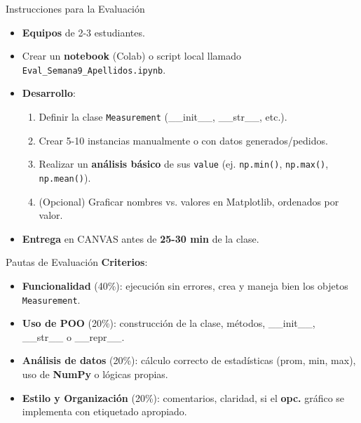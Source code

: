 \documentclass[10pt]{beamer}
\begin{document}
\begin{frame}{Instrucciones para la Evaluación}
  \begin{itemize}
    \item \textbf{Equipos} de 2-3 estudiantes.
    \item Crear un \textbf{notebook} (Colab) o script local llamado \texttt{Eval\_Semana9\_Apellidos.ipynb}.
    \item \textbf{Desarrollo}:
      \begin{enumerate}
        \item Definir la clase \texttt{Measurement} (\_\_init\_\_, \_\_str\_\_, etc.).
        \item Crear 5-10 instancias manualmente o con datos generados/pedidos.
        \item Realizar un \textbf{análisis básico} de sus \texttt{value} (ej. \texttt{np.min()}, \texttt{np.max()}, \texttt{np.mean()}).
        \item (Opcional) Graficar nombres vs. valores en Matplotlib, ordenados por valor.
      \end{enumerate}
    \item \textbf{Entrega} en CANVAS antes de \textbf{25-30 min} de la clase.
  \end{itemize}
\end{frame}

\begin{frame}{Pautas de Evaluación}
  \textbf{Criterios}:
  \begin{itemize}
    \item \textbf{Funcionalidad} (40\%): ejecución sin errores, crea y maneja bien los objetos \texttt{Measurement}.
    \item \textbf{Uso de POO} (20\%): construcción de la clase, métodos, \_\_init\_\_, \_\_str\_\_ o \_\_repr\_\_.
    \item \textbf{Análisis de datos} (20\%): cálculo correcto de estadísticas (prom, min, max), uso de \textbf{NumPy} o lógicas propias.
    \item \textbf{Estilo y Organización} (20\%): comentarios, claridad, si el \textbf{opc.} gráfico se implementa con etiquetado apropiado.
  \end{itemize}
\end{frame}
\end{document}
